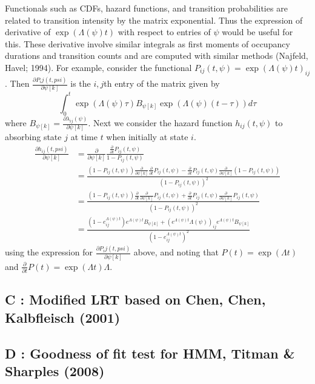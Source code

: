 \documentclass{uwstat572}
\begin{document}
Functionals such as CDFs, hazard functions, and transition probabilities are related to transition intensity by the matrix exponential. Thus the expression of derivative of $\exp(\Lambda(\psi)t)$ with respect to entries of $\psi$ would be useful for this. These derivative involve similar integrals as first moments of occupancy durations and transition counts and are computed with similar methods (Najfeld, Havel; 1994). For example, consider the functional $P_{ij}(t,\psi) = \exp (\Lambda(\psi)t)_{ij}$. Then $\frac{\partial P_ij(t,psi)}{\partial \psi [k]}$ is the $i,j$th entry of the matrix given by \[\int_{0}^t \exp (\Lambda (\psi) \tau) B_{\psi [k]} \exp (\Lambda (\psi) (t-\tau)) d \tau\] 
where $B_{\psi [k]} = \frac{\partial \lambda_{ij} (\psi)}{\partial \psi [k]}$. Next we consider the hazard function $h_{ij}(t,\psi)$ to absorbing state $j$  at time $t$ when initially at state $i$. \begin{align*}
\frac{\partial h_{ij}(t,psi)}{\partial \psi [k]} &= \frac{\partial}{\partial \psi [k]} \frac{\frac{\partial}{\partial t}P_{ij}(t,\psi)}{1-P_{ij}(t,\psi)}\\
& =\frac{(1-P_{ij}(t,\psi))\frac{\partial}{\partial \psi [k]} \frac{\partial}{\partial t}P_{ij}(t,\psi)- \frac{\partial}{\partial t}P_{ij}(t,\psi)\frac{\partial}{\partial \psi [k]} (1-P_{ij}(t,\psi))}{(1-P_{ij}(t,\psi))^2}\\
& =\frac{(1-P_{ij}(t,\psi)) \frac{\partial}{\partial t}\frac{\partial}{\partial \psi [k]}P_{ij}(t,\psi) + \frac{\partial}{\partial t}P_{ij}(t,\psi)\frac{\partial}{\partial \psi [k]} P_{ij}(t,\psi)}{(1-P_{ij}(t,\psi))^2}\\
&= \frac{(1-e^{\Lambda (\psi) t}_{ij}) e^{\Lambda (\psi) t} B_{\psi [k]} + (e^{\Lambda (\psi) t} \Lambda (\psi) )_{ij} e^{\Lambda (\psi) t} B_{\psi [k]}}{(1-e^{\Lambda (\psi) t}_{ij})^2}
\end{align*}
using the expression for $\frac{\partial P_ij(t,psi)}{\partial \psi [k]}$ above, and noting that $P(t)= \exp(\Lambda t)$ and $\frac{\partial}{\partial t} P(t) = \exp(\Lambda t) \Lambda$.
\subsection*{C : Modified LRT based on Chen, Chen, Kalbfleisch (2001)}
\subsection*{D : Goodness of fit test for HMM, Titman \& Sharples (2008)}
\end{document}
